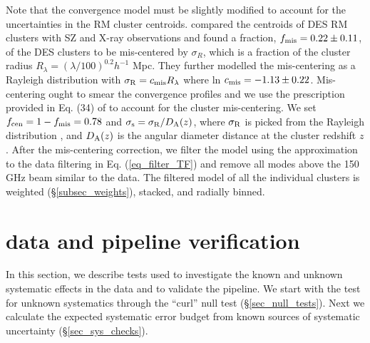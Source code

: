 Note that the convergence model must be slightly modified to account for the uncertainties in the RM cluster centroids.
\citet{rykoff16} compared the centroids of DES RM clusters with SZ \citep{bleem15} and X-ray observations and found a fraction, $f_{\rm mis} = 0.22 \pm 0.11$, of the DES clusters to be mis-centered by $\sigma_{R}$, which is a fraction of the cluster radius $R_{\lambda} = (\lambda/100)^{0.2} h^{-1}$ Mpc. They further modelled the mis-centering as a Rayleigh distribution with $\sigma_{\rm R}  = c_{\rm mis} R_{\lambda}$ where ln $c_{\rm mis} = -1.13 \pm 0.22$.
Mis-centering ought to smear the convergence profiles and we use the prescription provided in Eq. (34) of \citet{oguri10} to account for the cluster mis-centering. We set \mbox{$f_{\rm cen} = 1- f_{\rm mis} =  0.78$} and $\sigma_{\rm s} = \sigma_{\rm R}/D_{\rm A}(z)$, where $\sigma_{\rm R}$ is picked from the Rayleigh distribution \citep{rykoff16}, and $D_{\rm A}(z)$ is the angular diameter distance at the cluster redshift $z$.
After the mis-centering correction, we filter the model using the approximation to the data filtering in Eq. (\ref{eq_filter_TF}) and remove all modes above the \sptpol{} 150 GHz beam similar to the data. %
The filtered model of all the individual clusters is weighted (\S\ref{subsec_weights}), stacked, and radially binned. 


\section{data and pipeline verification}
\label{sec:pipeline_verfication}
In this section, we describe tests used to investigate the known and unknown systematic effects in the data and to validate the pipeline.
We start with the test for unknown systematics through the ``curl'' null test (\S\ref{sec_null_tests}).
Next we calculate the expected systematic error budget from known sources of systematic uncertainty (\S\ref{sec_sys_checks}). 


